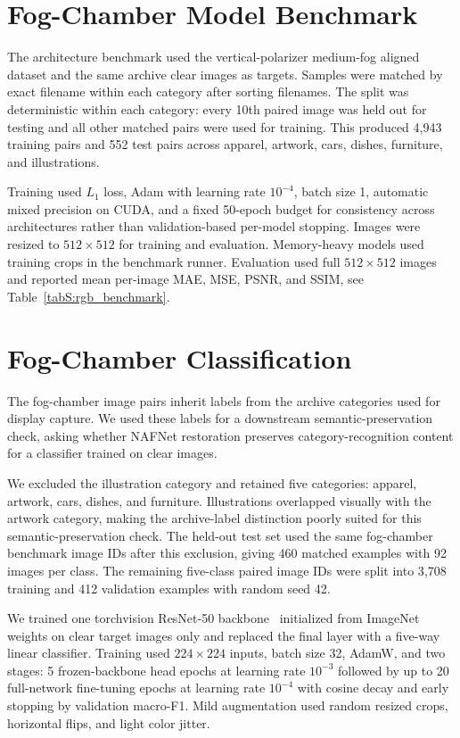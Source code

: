 \documentclass[9pt]{osa-supplemental-document}
\begin{document}
\section{Fog-Chamber Model Benchmark}

The architecture benchmark used the vertical-polarizer medium-fog aligned dataset and the same archive clear images as targets. Samples were matched by exact filename within each category after sorting filenames. The split was deterministic within each category: every 10th paired image was held out for testing and all other matched pairs were used for training. This produced 4{,}943 training pairs and 552 test pairs across apparel, artwork, cars, dishes, furniture, and illustrations.

Training used $L_1$ loss, Adam with learning rate $10^{-4}$, batch size 1, automatic mixed precision on CUDA, and a fixed 50-epoch budget for consistency across architectures rather than validation-based per-model stopping. Images were resized to $512 \times 512$ for training and evaluation. Memory-heavy models used training crops in the benchmark runner. Evaluation used full $512 \times 512$ images and reported mean per-image MAE, MSE, PSNR, and SSIM, see Table~\ref{tabS:rgb_benchmark}.


\FloatBarrier


\section{Fog-Chamber Classification}

The fog-chamber image pairs inherit labels from the archive categories used for display capture. We used these labels for a downstream semantic-preservation check, asking whether NAFNet restoration preserves category-recognition content for a classifier trained on clear images.

We excluded the illustration category and retained five categories: apparel, artwork, cars, dishes, and furniture. Illustrations overlapped visually with the artwork category, making the archive-label distinction poorly suited for this semantic-preservation check. The held-out test set used the same fog-chamber benchmark image IDs after this exclusion, giving 460 matched examples with 92 images per class. The remaining five-class paired image IDs were split into 3{,}708 training and 412 validation examples with random seed 42.

We trained one torchvision ResNet-50 backbone~\cite{he2016deep} initialized from ImageNet weights on clear target images only and replaced the final layer with a five-way linear classifier. Training used $224 \times 224$ inputs, batch size 32, AdamW, and two stages: 5 frozen-backbone head epochs at learning rate $10^{-3}$ followed by up to 20 full-network fine-tuning epochs at learning rate $10^{-4}$ with cosine decay and early stopping by validation macro-F1. Mild augmentation used random resized crops, horizontal flips, and light color jitter.
\end{document}
